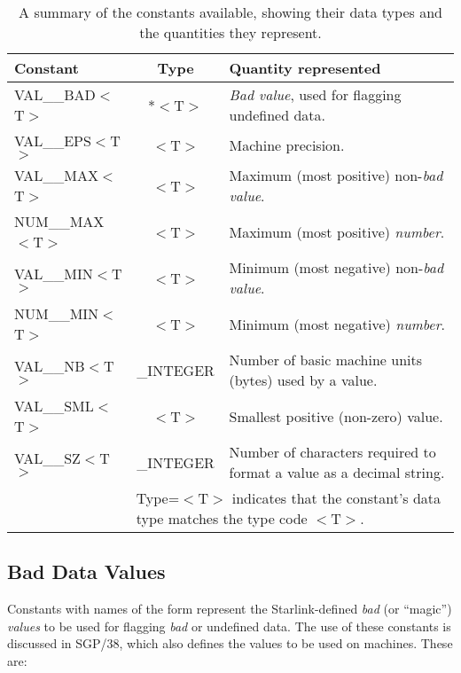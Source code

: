 \begin{table}
\begin{center}
\begin{tabular}{|l|c|p{25em}|}
\hline
{\bf Constant} & {\bf Type} & {\bf Quantity represented} \\
\hline
VAL\_\_BAD$<$T$>$ & *$<$T$>$ & {\em Bad value}, used for flagging undefined
data.
\\
VAL\_\_EPS$<$T$>$ & $<$T$>$ & Machine precision.
\\
VAL\_\_MAX$<$T$>$ & $<$T$>$ & Maximum (most positive) non-{\em bad value}.
\\
NUM\_\_MAX$<$T$>$ & $<$T$>$ & Maximum (most positive) {\em number}.
\\
VAL\_\_MIN$<$T$>$ & $<$T$>$ & Minimum (most negative) non-{\em bad value}.
\\
NUM\_\_MIN$<$T$>$ & $<$T$>$ & Minimum (most negative) {\em number}.
\\
VAL\_\_NB$<$T$>$ & \_INTEGER & Number of basic machine units (bytes) used
by a value.
\\
VAL\_\_SML$<$T$>$ & $<$T$>$ & Smallest positive (non-zero) value.
\\
VAL\_\_SZ$<$T$>$ & \_INTEGER & Number of characters required to format a
value as a decimal string.
\\
\hline
\multicolumn{1}{|c}{} &
\multicolumn{2}{l|}{\footnotesize *Type=$<$T$>$ indicates that the
constant's data type matches the type code $<$T$>$.} \\
\hline
\end{tabular}
\caption{A summary of the constants available, showing their data types and
the quantities they represent.}
\label{table:constants}
\end{center}
\end{table}

\subsection{Bad Data Values}
\label{section:badconstants}

Constants with names of the form  represent the
Starlink-defined {\em bad} (or ``magic'') {\em values} to be used for
flagging {\em bad} or undefined data.
The use of these constants is discussed in SGP/38, which also defines the
values to be used on  machines.
These are:

